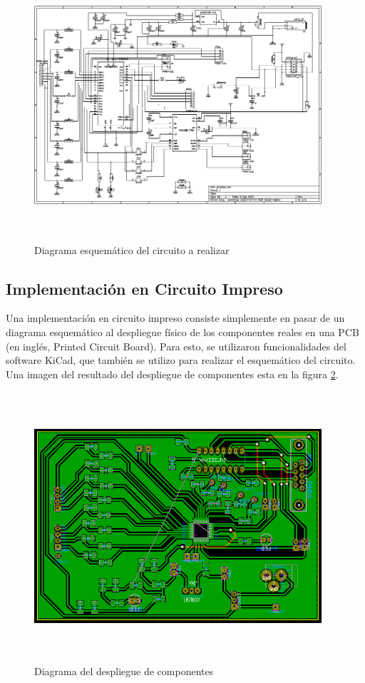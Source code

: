 \documentclass{article}
\theoremstyle{definition}
\theoremstyle{remark}
\begin{document}
\begin{figure}[h]
  \centering
  \includegraphics[width=0.95\textwidth, height = 10cm]{esquematico}
  \caption{\small Diagrama esquemático del circuito a realizar}\label{fig:esquematico}
\end{figure}



\subsection{Implementación en Circuito Impreso} %
\label{sub:implementacion_en_circuito_impreso}

Una implementación en circuito impreso consiste simplemente en pasar de un diagrama esquemático al despliegue físico de los componentes reales en una PCB (en inglés, Printed Circuit Board). Para esto, se utilizaron funcionalidades del software KiCad, que también se utilizo para realizar el esquemático del circuito. Una imagen del resultado del despliegue de componentes esta en la figura \ref{fig:PCB1}.

\begin{figure}[h]
  \centering
  \includegraphics[width=0.95\textwidth, height = 10cm]{PCB1}
  \caption{\small Diagrama del despliegue de componentes}\label{fig:PCB1}
\end{figure}
\end{document}
